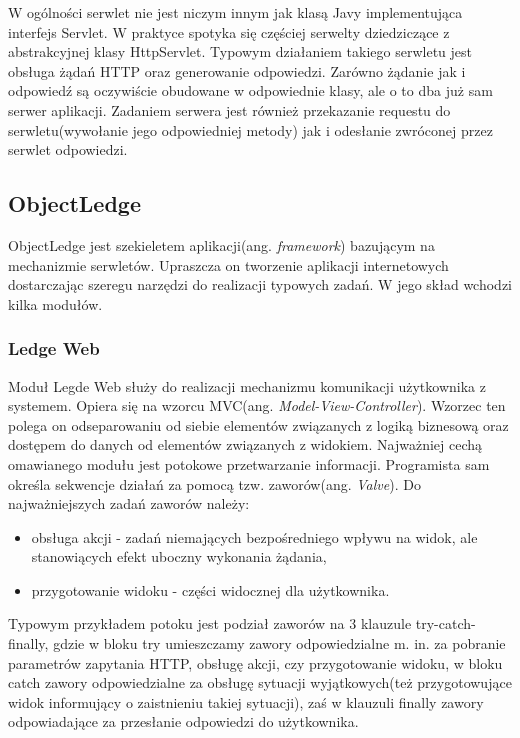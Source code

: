 W ogólności serwlet nie jest niczym innym jak klasą Javy implementująca interfejs Servlet. W praktyce spotyka się częściej serwelty dziedziczące z abstrakcyjnej klasy HttpServlet. Typowym działaniem takiego serwletu jest obsługa żądań HTTP oraz generowanie odpowiedzi. Zarówno żądanie jak i odpowiedź są oczywiście obudowane w odpowiednie klasy, ale o to dba już sam serwer aplikacji. Zadaniem serwera jest również przekazanie requestu do serwletu(wywołanie jego odpowiedniej metody) jak i odesłanie zwróconej przez serwlet odpowiedzi.

\subsection[ObjectLedge][ObjectLedge]{ObjectLedge}
ObjectLedge jest szekieletem aplikacji(ang. \textit{framework}) bazującym na mechanizmie serwletów. Upraszcza on tworzenie aplikacji internetowych dostarczając szeregu narzędzi do realizacji typowych zadań. W jego skład wchodzi kilka modułów.

\subsubsection{Ledge Web}
Moduł Legde Web służy do realizacji mechanizmu komunikacji użytkownika z systemem. Opiera się na wzorcu MVC(ang. \textit{Model-View-Controller}). Wzorzec ten polega on odseparowaniu od siebie elementów związanych z logiką biznesową oraz dostępem do danych od elementów związanych z widokiem. Najważniej cechą omawianego modułu jest potokowe przetwarzanie informacji. Programista sam określa sekwencje działań za pomocą tzw. zaworów(ang. \textit{Valve}). Do najważniejszych zadań zaworów należy:
\begin{itemize}
	\item obsługa akcji - zadań niemających bezpośredniego wpływu na widok, ale stanowiących efekt uboczny wykonania żądania,
	\item przygotowanie widoku - części widocznej dla użytkownika.
\end{itemize}
Typowym przykładem potoku jest podział zaworów na 3 klauzule try-catch-finally, gdzie w bloku try umieszczamy zawory odpowiedzialne m. in. za pobranie parametrów zapytania HTTP, obsługę akcji, czy przygotowanie widoku, w bloku catch zawory odpowiedzialne za obsługę sytuacji wyjątkowych(też przygotowujące widok informujący o zaistnieniu takiej sytuacji), zaś w klauzuli finally zawory odpowiadające za przesłanie odpowiedzi do użytkownika.

